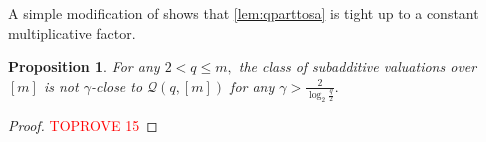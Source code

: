\documentclass[11pt]{article}\usepackage{amsfonts}
\newtheorem{proposition}[theorem]{Proposition}
\numberwithin{theorem}{subsection}
\newcommand{\classqm}{\mathcal{Q}(q,[m])}
\begin{document}
\noindent
A simple modification of \cite[Appendix C]{BhawalkarR11} shows that \cref{lem:qparttosa} is tight up to a constant multiplicative factor.

\begin{proposition}
\label{lem:salogclose}
For any $2< q \le m,$ the class of subadditive valuations over $[m]$ is not $\gamma$-close to $\classqm$ for any
$\gamma >\frac{2}{\log_2 \frac{q}{2}}.$
\end{proposition}
\begin{proof}\textcolor{red}{TOPROVE 15}\end{proof}
\end{document}
